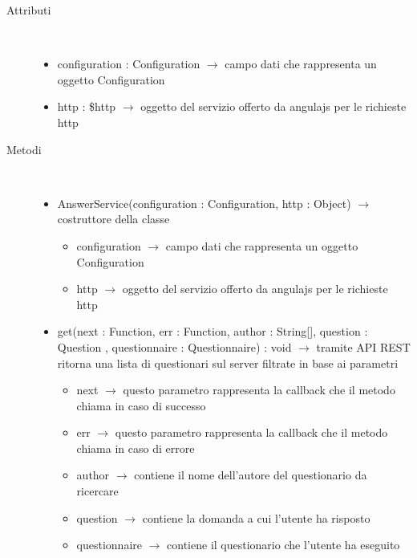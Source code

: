 \begin{description}
\item[Attributi] \hfill \\
\vspace{-7mm}
\begin{itemize}
	\item configuration : Configuration $\rightarrow$ campo dati che rappresenta un oggetto Configuration
	\item http : \$http $\rightarrow$ oggetto del servizio offerto da angulajs per le richieste http	
\end{itemize}

\item[Metodi] \hfill \\
\vspace{-7mm}
\begin{itemize}
	\item AnswerService(configuration : Configuration, http : Object) $\rightarrow$ costruttore della classe\begin{itemize}
		\item configuration $\rightarrow$ campo dati che rappresenta un oggetto Configuration	
		\item http $\rightarrow$ oggetto del servizio offerto da angulajs per le richieste http	
	\end{itemize}
	
	\item get(next : Function, err : Function, author : String[], question : Question	, questionnaire : Questionnaire) : void $\rightarrow$ tramite API REST ritorna una lista di questionari sul server filtrate in base ai parametri	\begin{itemize}
		\item next $\rightarrow$ questo parametro rappresenta la callback che il metodo chiama in caso di successo
		\item err $\rightarrow$ questo parametro rappresenta la callback che il metodo chiama in caso di errore	
		\item author $\rightarrow$ contiene il nome dell'autore del questionario da ricercare
		\item question $\rightarrow$ contiene la domanda a cui l'utente ha risposto
		\item questionnaire $\rightarrow$ contiene il questionario che l'utente ha eseguito
	\end{itemize}
	

\end{itemize}
\end{description}
